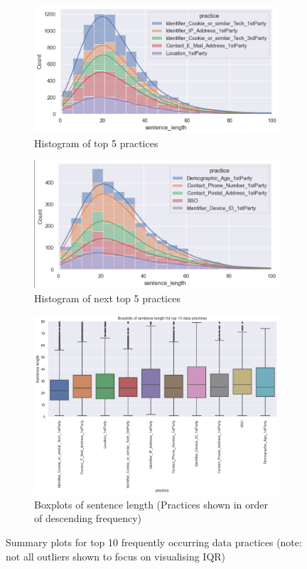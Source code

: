 \begin{figure}[!ht]
	\begin{subfigure}[t]{.5\linewidth}
	  \centering
	  \includegraphics[width=1\linewidth]{figures/hist_eda.png}
	  \caption{Histogram of top 5 practices}
	  \label{fig:hist}
	\end{subfigure}
	\hfill
	\begin{subfigure}[t]{.5\linewidth}
		\centering
		\includegraphics[width=1\linewidth]{figures/hist_eda_2.png}
		\caption{Histogram of next top 5 practices}
		\label{fig:hist_2}
	\end{subfigure}
	\medskip
	\begin{subfigure}[b]{1\linewidth}
	  \centering
	  \includegraphics[width=0.85\linewidth]{figures/eda_boxplots.png}
	  \caption{Boxplots of sentence length (Practices shown in order of descending frequency)}
	  \label{fig:boxplot_top_10}
	\end{subfigure}
	\caption{Summary plots for top 10 frequently occurring data practices (note: not all outliers shown to focus on visualising IQR)}
	\label{fig:eda}
\end{figure}


